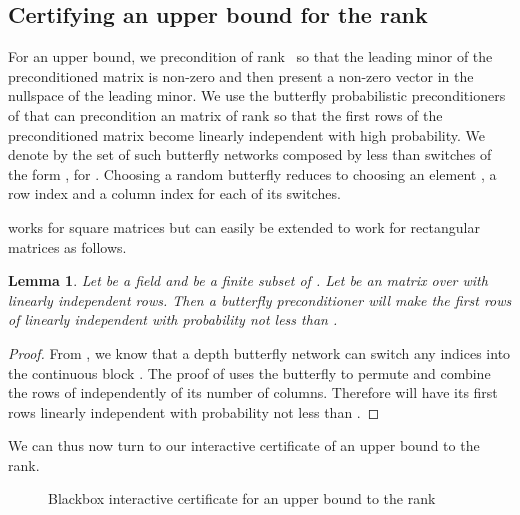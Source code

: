 \documentclass{article}
\let\oldresizebox\resizebox
\renewcommand{\resizebox}[3]{\oldresizebox{\linewidth}{!}{#3}}
\newtheorem{lemma}{Lemma}
\begin{document}
\subsection{Certifying an upper bound for the rank}
For an upper bound, we precondition  of rank~ so that the
leading  minor of the preconditioned matrix is non-zero and then
present a non-zero vector in the nullspace of the  leading minor. 
We use the butterfly probabilistic preconditioners of 
\cite[Theorem 6.3]{Chen:2002:EMP} that can precondition an  matrix of
rank  so that the first  rows of the preconditioned matrix become linearly
independent with high probability. 
We denote by  the set of such butterfly networks composed by
less than  switches of the form
, for
. Choosing a random butterfly reduces to choosing an element
, a row index and a column index for each of its switches.

 
\cite[Theorem 6.3]{Chen:2002:EMP} works for square matrices but can easily be
extended to work for rectangular matrices as follows.
\begin{lemma}\label{lem:genbut}
  Let  be a field and  be a finite subset of .
  Let  be an  matrix over 
  with  linearly independent rows. Then a butterfly preconditioner
   will make the first  rows of  linearly independent
  with probability not less than .
\end{lemma}
\begin{proof}
From  
\cite[Theorem 6.2]{Chen:2002:EMP}, 
we know that a depth  butterfly network can switch any
 indices into the continuous block . 
The proof of \cite[Theorem 6.3]{Chen:2002:EMP} uses the butterfly to
permute and combine the rows of  independently of its number of columns.
Therefore  will have its first  rows linearly independent with probability not less than .
\end{proof}
We can thus now turn to our interactive certificate of an upper bound to the rank.

\begin{figure*}[htbp]\center 
  \noindent\resizebox{0.9\linewidth}{!}{
  }
  \caption{Blackbox interactive certificate for an upper bound to the
    rank}\label{fig:upperbound} 
\end{figure*}
\end{document}
